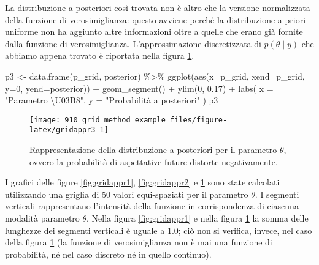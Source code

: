 \documentclass[
]{memoir}
\newenvironment{Shaded}{\begin{snugshade}}{\end{snugshade}}
\newcommand{\AttributeTok}[1]{\textcolor[rgb]{0.77,0.63,0.00}{#1}}
\newcommand{\DecValTok}[1]{\textcolor[rgb]{0.00,0.00,0.81}{#1}}
\newcommand{\FloatTok}[1]{\textcolor[rgb]{0.00,0.00,0.81}{#1}}
\newcommand{\FunctionTok}[1]{\textcolor[rgb]{0.00,0.00,0.00}{#1}}
\newcommand{\NormalTok}[1]{#1}
\newcommand{\OtherTok}[1]{\textcolor[rgb]{0.56,0.35,0.01}{#1}}
\newcommand{\SpecialCharTok}[1]{\textcolor[rgb]{0.00,0.00,0.00}{#1}}
\newcommand{\StringTok}[1]{\textcolor[rgb]{0.31,0.60,0.02}{#1}}
\begin{document}
La distribuzione a posteriori così trovata non è altro che la versione normalizzata della funzione di verosimiglianza: questo avviene perché la distribuzione a priori uniforme non ha aggiunto altre informazioni oltre a quelle che erano già fornite dalla funzione di verosimiglianza. L'approssimazione discretizzata di \(p(\theta \mid y)\) che abbiamo appena trovato è riportata nella figura \ref{fig:gridappr3}.

\begin{Shaded}
\begin{Highlighting}[]
\NormalTok{p3 }\OtherTok{\textless{}{-}} \FunctionTok{data.frame}\NormalTok{(p\_grid, posterior) }\SpecialCharTok{\%\textgreater{}\%}
  \FunctionTok{ggplot}\NormalTok{(}\FunctionTok{aes}\NormalTok{(}\AttributeTok{x=}\NormalTok{p\_grid, }\AttributeTok{xend=}\NormalTok{p\_grid, }\AttributeTok{y=}\DecValTok{0}\NormalTok{, }\AttributeTok{yend=}\NormalTok{posterior)) }\SpecialCharTok{+}
  \FunctionTok{geom\_segment}\NormalTok{() }\SpecialCharTok{+}
  \FunctionTok{ylim}\NormalTok{(}\DecValTok{0}\NormalTok{, }\FloatTok{0.17}\NormalTok{) }\SpecialCharTok{+}
  \FunctionTok{labs}\NormalTok{(}
    \AttributeTok{x =} \StringTok{"Parametro \textbackslash{}U03B8"}\NormalTok{,}
    \AttributeTok{y =} \StringTok{"Probabilità a posteriori"}
\NormalTok{  )}
\NormalTok{p3}
\end{Highlighting}
\end{Shaded}

\begin{figure}

{\centering \texttt{[image: 910\_grid\_method\_example\_files/figure-latex/gridappr3-1]} 

}

\caption{Rappresentazione della distribuzione a posteriori per il parametro $\theta$, ovvero la probabilità di aspettative future distorte negativamente.}\label{fig:gridappr3}
\end{figure}

I grafici delle figure \ref{fig:gridappr1}, \ref{fig:gridappr2} e \ref{fig:gridappr3} sono state calcolati utilizzando una griglia di 50 valori equi-spaziati per il parametro \(\theta\). I segmenti verticali rappresentano l'intensità della funzione in corrispondenza di ciascuna modalità parametro \(\theta\). Nella figura \ref{fig:gridappr1} e nella figura \ref{fig:gridappr3} la somma delle lunghezze dei segmenti verticali è uguale a 1.0; ciò non si verifica, invece, nel caso della figura \ref{fig:gridappr3} (la funzione di verosimiglianza non è mai una funzione di probabilità, né nel caso discreto né in quello continuo).
\end{document}
